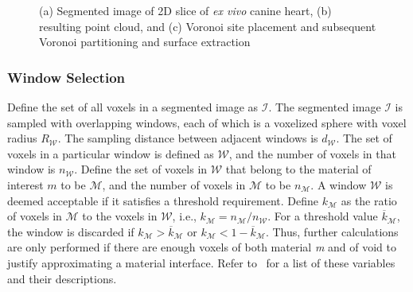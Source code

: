 \begin{figure}
{\label{fig:d2dvor2}}
%
\caption{(a) Segmented image of 2D slice of \textit{ex vivo} canine heart, (b) resulting point cloud, and (c) Voronoi site placement and subsequent Voronoi partitioning and surface extraction}
\label{fig:d2dvor}
\end{figure}

\subsubsection{Window Selection}

Define the set of all voxels in a segmented image as $\mathcal{I}$. The segmented image  $\mathcal{I}$ is sampled with overlapping windows, each of which is a voxelized sphere with voxel radius $R_{\mathcal{W}}$. The sampling distance between adjacent windows is $d_{\mathcal{W}}$. The set of voxels in a particular window is defined as $\mathcal{W}$, and the number of voxels in that window is $n_{\mathcal{W}}$. Define the set of voxels in $\mathcal{W}$ that belong to the material of interest $m$ to be $\mathcal{M}$, and the number of voxels in $\mathcal{M}$ to be $n_{\mathcal{M}}$. A window $\mathcal{W}$ is deemed acceptable if it satisfies a threshold requirement. Define $k_{\mathcal{M}}$ as the ratio of voxels in $\mathcal{M}$ to the voxels in $\mathcal{W}$, i.e., $k_{\mathcal{M}} = n_{\mathcal{M}}/n_{\mathcal{W}}$. For a threshold value $\overline{k}_{\mathcal{M}}$, the window is discarded if $k_{\mathcal{M}} > \overline{k}_{\mathcal{M}}$ or $k_{\mathcal{M}} < 1 - \overline{k}_{\mathcal{M}}$. Thus, further calculations are only performed if there are enough voxels of both material \textit{m} and of void to justify approximating a material interface. Refer to~ for a list of these variables and their descriptions. 

